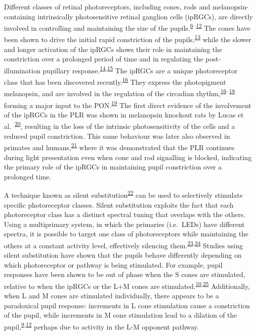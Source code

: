 \documentclass[
]{article}
\begin{document}
Different classes of retinal photoreceptors, including cones, rods and melanopsin-containing intrinsically photosensitive retinal ganglion cells (ipRGCs), are directly involved in controlling and maintaining the size of the pupils.\textsuperscript{\protect\hyperlink{ref-Barrionuevo2014}{6}--\protect\hyperlink{ref-Woelders2018}{12}} The cones have been shown to drive the initial rapid constriction of the pupils,\textsuperscript{\protect\hyperlink{ref-Mathot2018}{13}} while the slower and longer activation of the ipRGCs shows their role in maintaining the constriction over a prolonged period of time and in regulating the post-illumination pupillary response.\textsuperscript{\protect\hyperlink{ref-Markwell2010}{14},\protect\hyperlink{ref-McDougal2010}{15}} The ipRGCs are a unique photoreceptor class that has been discovered recently.\textsuperscript{\protect\hyperlink{ref-Provencio2000}{16}} They express the photopigment melanopsin, and are involved in the regulation of the circadian rhythm,\textsuperscript{\protect\hyperlink{ref-Provencio2000}{16}--\protect\hyperlink{ref-Ruby2002}{18}} forming a major input to the PON.\textsuperscript{\protect\hyperlink{ref-Dacey2003}{19}} The first direct evidence of the involvement of the ipRGCs in the PLR was shown in melanopsin knockout rats by Lucas et al.~\textsuperscript{\protect\hyperlink{ref-Lucas2003}{20}}, resulting in the loss of the intrinsic photosensitivity of the cells and a reduced pupil constriction. This same behaviour was later also observed in primates and humans,\textsuperscript{\protect\hyperlink{ref-Gamlin2007}{21}} where it was demonstrated that the PLR continues during light presentation even when cone and rod signalling is blocked, indicating the primary role of the ipRGCs in maintaining pupil constriction over a prolonged time.

A technique known as silent substitution\textsuperscript{\protect\hyperlink{ref-Estevez1982}{22}} can be used to selectively stimulate specific photoreceptor classes. Silent substitution exploits the fact that each photoreceptor class has a distinct spectral tuning that overlaps with the others. Using a multiprimary system, in which the primaries (i.e.~LEDs) have different spectra, it is possible to target one class of photoreceptors while maintaining the others at a constant activity level, effectively silencing them.\textsuperscript{\protect\hyperlink{ref-Shapiro1996}{23},\protect\hyperlink{ref-Spitschan2018}{24}} Studies using silent substitution have shown that the pupils behave differently depending on which photoreceptor or pathway is being stimulated. For example, pupil responses have been shown to be out of phase when the S cones are stimulated, relative to when the ipRGCs or the L+M cones are stimulated.\textsuperscript{\protect\hyperlink{ref-Spitschan2014}{10},\protect\hyperlink{ref-Cao2015}{25}} Additionally, when L and M cones are stimulated individually, there appears to be a paradoxical pupil response: increments in L cone stimulation cause a constriction of the pupil, while increments in M cone stimulation lead to a dilation of the pupil,\textsuperscript{\protect\hyperlink{ref-Murray2018}{9},\protect\hyperlink{ref-Woelders2018}{12}} perhaps due to activity in the L-M opponent pathway.
\end{document}

